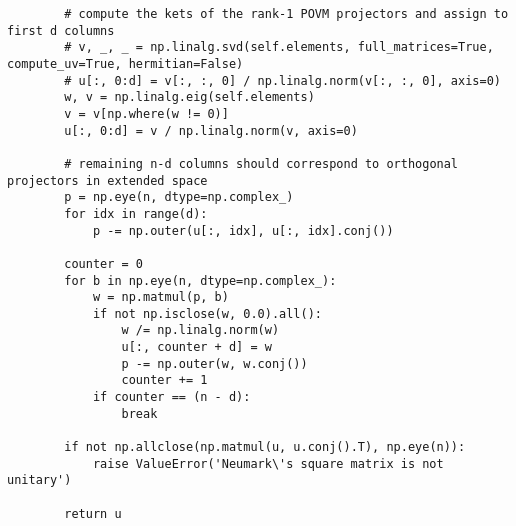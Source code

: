\begin{verbatim}
        # compute the kets of the rank-1 POVM projectors and assign to first d columns
        # v, _, _ = np.linalg.svd(self.elements, full_matrices=True, compute_uv=True, hermitian=False)
        # u[:, 0:d] = v[:, :, 0] / np.linalg.norm(v[:, :, 0], axis=0)
        w, v = np.linalg.eig(self.elements)
        v = v[np.where(w != 0)]
        u[:, 0:d] = v / np.linalg.norm(v, axis=0)

        # remaining n-d columns should correspond to orthogonal projectors in extended space
        p = np.eye(n, dtype=np.complex_)
        for idx in range(d):
            p -= np.outer(u[:, idx], u[:, idx].conj())

        counter = 0
        for b in np.eye(n, dtype=np.complex_):
            w = np.matmul(p, b)
            if not np.isclose(w, 0.0).all():
                w /= np.linalg.norm(w)
                u[:, counter + d] = w
                p -= np.outer(w, w.conj())
                counter += 1
            if counter == (n - d):
                break

        if not np.allclose(np.matmul(u, u.conj().T), np.eye(n)):
            raise ValueError('Neumark\'s square matrix is not unitary')

        return u
\end{verbatim}
\newpage
